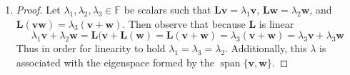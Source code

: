 \documentclass[12pt]{amsart}
\newcommand{\la}{\lambda}
\begin{document}
\begin{enumerate}[label=\arabic*.]
\vspace{2.5em}

	\item 
\begin{proof}
	Let \(\la_1,\la_2,\la_3\in\mathbb{F}\) 
	be scalars such that
	\(\mathbf{L}\mathbf{v} = \la_1\mathbf{v}\),
	\(\mathbf{L}\mathbf{w} = \la_2\mathbf{w}\), and
	\(\mathbf{L}(\mathbf{v}\mathbf{w}) = \la_3(\mathbf{v}+\mathbf{w})\).
	Then observe that because \(\mathbf{L}\) is linear 
	\[
	\la_1\mathbf{v} + \la_2\mathbf{w} 
	= \mathbf{L}(\mathbf{v} + \mathbf{L}(\mathbf{w}) 
	= \mathbf{L}(\mathbf{v}+\mathbf{w}) 
	= \la_3(\mathbf{v}+\mathbf{w})
	= \la_3\mathbf{v}+\la_3\mathbf{w}
	\]
	Thus in order for linearity to hold \(\la_1=\la_3=\la_2\). Additionally, this \(\la\) is associated with the eigenspace formed by the \(\operatorname{span}\{\mathbf{v},\mathbf{w}\}\).
\end{proof}
\end{enumerate}
\end{document}
